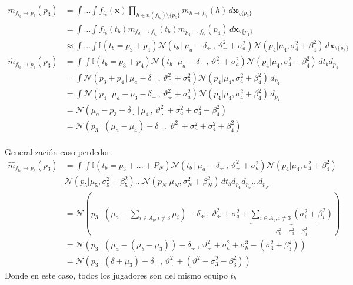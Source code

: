 \documentclass[11pt,twoside,spanish]{report} %
\begin{document}
\begin{equation}
	\begin{split}
		m_{f_{t_b} \rightarrow p_3}(p_3) &= \int \dots \int f_{t_b}(\textbf{x}) \prod_{h \in n(f_{t_b}) \setminus \{p_3\} } m_{h \rightarrow f_{t_b}}(h) \, d\textbf{x}_{\setminus \{p_3\} }  \\
		&= \int \dots \int f_{t_b}(t_b)  m_{f_{d_1} \rightarrow f_{t_b}}(t_b) m_{p_4 \rightarrow f_{t_b}}(p_4)\, d\textbf{x}_{\setminus \{p_1\} }  \\
		&\approx  \int \dots \int \mathbb{I}(t_b = p_3 + p_4) \mathcal{N}(t_b \, | \, \mu_a - \delta_{\div} \, , \, \vartheta_{\div}^2 + \sigma_a^2) \mathcal{N}(p_4 | \mu_4 , \sigma_4^2 + \beta_4^2)  \, d\textbf{x}_{\setminus \{p_3\} } \\[0.1cm]
		\widehat{m}_{f_{t_b} \rightarrow p_3}(p_3)  & =\int \int \mathbb{I}(t_b = p_3 + p_4) \mathcal{N}(t_b \, | \, \mu_a - \delta_{\div} \, , \, \vartheta_{\div}^2 + \sigma_a^2) \mathcal{N}(p_4 | \mu_4 , \sigma_4^2 + \beta_4^2)  \, d{t_b} d_{p_4} \\
		& =\int \mathcal{N}(p_3 + p_4 \, | \, \mu_a - \delta_{\div} \, , \, \vartheta_{\div}^2 + \sigma_a^2) \mathcal{N}(p_4 | \mu_4 , \sigma_4^2+ \beta_4^2 )   \, d_{p_4} \\
		& =\int \mathcal{N}(p_4 \, | \, \mu_a - p_3 - \delta_{\div} \, , \, \vartheta_{\div}^2 + \sigma_a^2) \mathcal{N}(p_4 | \mu_4 , \sigma_4^2 + \beta_4^2)   \, d_{p_4} \\
		& = \mathcal{N}(\mu_a - p_3 - \delta_{\div} \,|\, \mu_4 \,,\,\vartheta_{\div}^2 + \sigma_a^2 + \sigma_4^2 + \beta_4^2)   \\
		&=  \mathcal{N}( p_3 \,|\,  (\mu_a - \mu_4) - \delta_{\div}  \,,\,\vartheta_{\div}^2 + \sigma_a^2 + \sigma_4^2 + \beta_4^2)  \\
	\end{split}
\end{equation}

Generalizaci\'on caso perdedor.
\begin{equation}
	\begin{split}
		\widehat{m}_{f_{t_b} \rightarrow p_3}(p_3) &=\int \int \mathbb{I}(t_b = p_3+ ...+ P_N) \mathcal{N}(t_b \, | \, \mu_a - \delta_{\div} \, , \, \vartheta_{\div}^2 + \sigma_a^2) \mathcal{N}(p_4 | \mu_4 , \sigma_4^2 + \beta_4^2)\\
		&\mathcal{N}(p_5 | \mu_5 , \sigma_5^2 + \beta_5^2)... \mathcal{N}(p_N | \mu_N , \sigma_N^2 + \beta_N^2)  \, d{t_b} d_{p_4}d_{p_5}...d_{p_N} \\
		&= \mathcal{N}( p_3 \,|\, (\mu_a  - \sum_{i \in A_b, i\neq3} \mu_i) - \delta_{\div}  \,,\,\vartheta_{\div}^2 + \sigma_a^2 +\underbrace{\sum_{i \in A_b, i\neq3} (\sigma_i^2 + \beta_i^2)}_{\sigma_b^2 - \sigma_3^2 - \beta_3^2} ) \\
		&= \mathcal{N}( p_3 \,|\, (\mu_a  -  (\mu_b-\mu_3)) - \delta_{\div}  \,,\,\vartheta_{\div}^2 + \sigma_a^2 + \sigma_b^3 -(\sigma_3^2 + \beta_3^2) ) \\
		& = \mathcal{N}( p_3 \,|\, (\delta + \mu_3) - \delta_{\div}  \,,\,\vartheta_{\div}^2 + (\vartheta^2 - \sigma_3^2 - \beta_3^2))
	\end{split}
\end{equation}
Donde en este caso, todos los jugadores son del mismo equipo $t_b$
\end{document}
